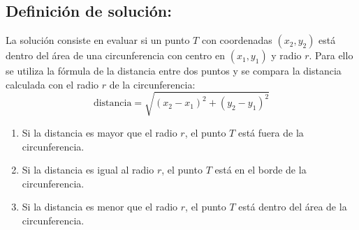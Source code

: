\subsection{\textbf{Definición de solución:}}
La solución consiste en evaluar si un punto $T$ con coordenadas $(x_{2}, y_{2})$ está dentro del área de una circunferencia con centro en $(x_{1}, y_{1})$ y radio $r$. Para ello se utiliza la fórmula de la distancia entre dos puntos y se compara la distancia calculada con el radio $r$ de la circunferencia:
    \begin{equation}
        \text{distancia} = \sqrt{ (x_2 - x_1)^2 + (y_2 - y_1)^2 }
    \end{equation}
    
    \begin{enumerate}
        \item Si la distancia es mayor que el radio $r$, el punto $T$ está fuera de la circunferencia.
        \item Si la distancia es igual al radio $r$, el punto $T$ está en el borde de la circunferencia.
        \item Si la distancia es menor que el radio $r$, el punto $T$ está dentro del área de la circunferencia.
    \end{enumerate}
